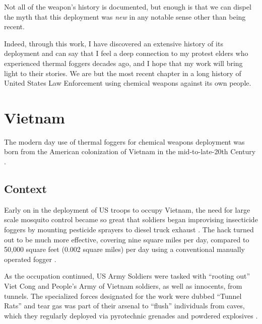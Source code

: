 \documentclass[
  12pt,
]{krantz}
\begin{document}
Not all of the weapon's history is documented, but enough is that we can dispel the myth that this deployment was \emph{new} in any notable sense other than being recent.

Indeed, through this work, I have discovered an extensive history of its deployment and can say that I feel a deep connection to my protest elders who experienced thermal foggers decades ago, and I hope that my work will bring light to their stories.
We are but the most recent chapter in a long history of United States Law Enforcement using chemical weapons against its own people.

\hypertarget{Vietnam}{%
\chapter*{Vietnam}\label{Vietnam}}


The modern day use of thermal foggers for chemical weapons deployment was born from the American colonization of Vietnam in the mid-to-late-20th Century \citep{Bunker1996}.

\hypertarget{context}{%
\section*{Context}\label{context}}


Early on in the deployment of US troops to occupy Vietnam, the need for large scale mosquito control became so great that soldiers began improvising insecticide foggers by mounting pesticide sprayers to diesel truck exhaust \citep{Spicknall1969}.
The hack turned out to be much more effective, covering nine square miles per day, compared to 50,000 square feet (0.002 square miles) per day using a conventional manually operated fogger \citep{Spicknall1969}.

As the occupation continued, US Army Soldiers were tasked with ``rooting out'' Viet Cong and People's Army of Vietnam soldiers, as well as innocents, from tunnels.
The specialized forces designated for the work were dubbed ``Tunnel Rats'' and tear gas was part of their arsenal to ``flush'' individuals from caves, which they regularly deployed via pyrotechnic grenades and powdered explosives \citep{NewYorkTimes1977, Rottman2006, Hemmings2019}.
\end{document}
